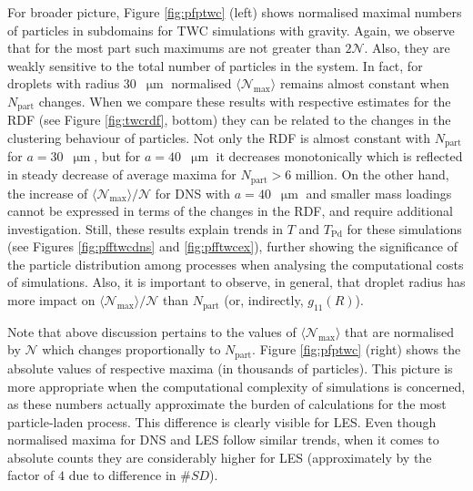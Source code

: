 \documentclass{pracamgren}
\begin{document}
For broader picture, Figure \ref{fig:pfptwc} (left) shows normalised maximal numbers of particles in subdomains for TWC simulations with gravity.
Again, we observe that for the most part such maximums are not greater than $2 \mathcal{N}$.
Also, they are weakly sensitive to the total number of particles in the system.
In fact, for droplets with radius $30$~$\upmu\text{m}$ normalised $\langle \mathcal{N}_{\max} \rangle$ remains almost constant when $N_{\text{part}}$ changes.
When we compare these results with respective estimates for the RDF (see Figure \ref{fig:twcrdf}, bottom) they can be related to the changes in the clustering behaviour of particles.
Not only the RDF is almost constant with $N_{\text{part}}$ for ${a = 30}$~$\upmu\text{m}$, but for $a = 40$~$\upmu\text{m}$ it decreases monotonically which is reflected in steady decrease of average maxima for $N_{\text{part}} > 6$ million.
On the other hand, the increase of $\langle \mathcal{N}_{\max} \rangle / \mathcal{N}$ for DNS with $a = 40$~$\upmu\text{m}$ and smaller mass loadings cannot be expressed in terms of the changes in the RDF, and require additional investigation.
Still, these results explain trends in $T$ and $T_{\text{Pd}}$ for these simulations (see Figures \ref{fig:pfftwcdns} and \ref{fig:pfftwcex}), further showing the significance of the particle distribution among processes when analysing the computational costs of simulations.
Also, it is important to observe, in general, that droplet radius has more impact on $\langle \mathcal{N}_{\max} \rangle / \mathcal{N}$ than $N_{\text{part}}$ (or, indirectly, $g_{11}(R)$).

Note that above discussion pertains to the values of $\langle \mathcal{N}_{\max} \rangle$  that are normalised by $\mathcal{N}$ which changes proportionally to $N_{\text{part}}$.
Figure \ref{fig:pfptwc} (right) shows the absolute values of respective maxima (in thousands of particles).
This picture is more appropriate when the computational complexity of simulations is concerned, as these numbers actually approximate the burden of calculations for the most particle-laden process.
This difference is clearly visible for LES.
Even though normalised maxima for DNS and LES follow similar trends, when it comes to absolute counts they are considerably higher for LES (approximately by the factor of $4$ due to difference in $\#SD$).
\end{document}
